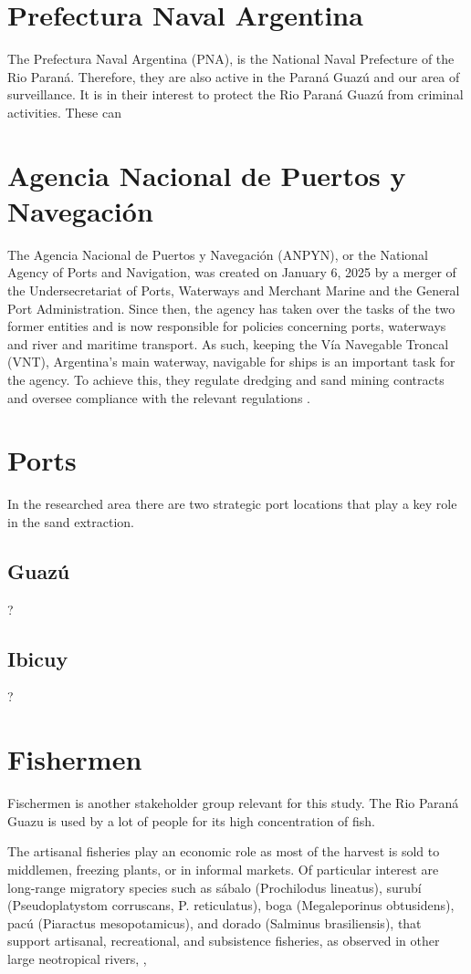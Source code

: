 \section{Prefectura Naval Argentina}
The Prefectura Naval Argentina (PNA), is the National Naval Prefecture of the Rio Paraná. Therefore, they are also active in the Paraná Guazú and our area of surveillance. 
It is in their interest to protect the Rio Paraná Guazú from criminal activities. These can 

\section{Agencia Nacional de Puertos y Navegación}
The Agencia Nacional de Puertos y Navegación (ANPYN), or the National Agency of Ports and Navigation, was created on January 6, 2025 by a merger of the Undersecretariat of Ports, Waterways and Merchant Marine and the General Port Administration. Since then, the agency has taken over the tasks of the two former entities and is now responsible for policies concerning ports, waterways and river and maritime transport. As such, keeping the Vía Navegable Troncal (VNT), Argentina's main waterway, navigable for ships is an important task for the agency. To achieve this, they regulate dredging and sand mining contracts and oversee compliance with the relevant regulations .

\section{Ports}
In the researched area there are two strategic port locations that play a key role in the sand extraction.

\subsection{Guazú}
?
\subsection{Ibicuy}
?

\section{Fishermen}
Fischermen is another stakeholder group relevant for this study. The Rio Paraná Guazu is used by a lot of people for its high concentration of fish. 

The artisanal fisheries play an economic role as most of the harvest is sold to middlemen, freezing plants, or in informal markets. Of particular interest are long-range migratory species such as sábalo (Prochilodus lineatus), surubí (Pseudoplatystom corruscans, P. reticulatus), boga (Megaleporinus obtusidens), pacú (Piaractus mesopotamicus), and dorado (Salminus brasiliensis), that support artisanal, recreational, and subsistence fisheries, as observed in other large neotropical rivers, \autocite{assessment of sabalo}, \autocite{fishers' knowledge}

